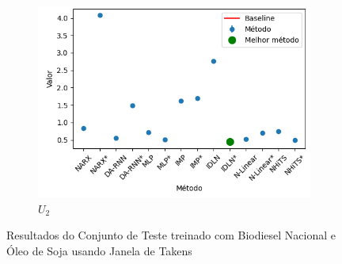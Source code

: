 \begin{figure}[htbp]
\begin{subfigure}[b]{0.3\textwidth}
		\includegraphics[width=\textwidth]{figuras/u2_takens_brasil_oil_results_test.png}
		\caption{\(U_2\)}
		\label{fig:u2_takens_brasil_oil_results_test}
	\end{subfigure}
	\caption{Resultados do Conjunto de Teste treinado com Biodiesel Nacional e Óleo de Soja usando Janela de Takens}
	\label{fig:takens_brasil_oil_results_test}
\end{figure}
